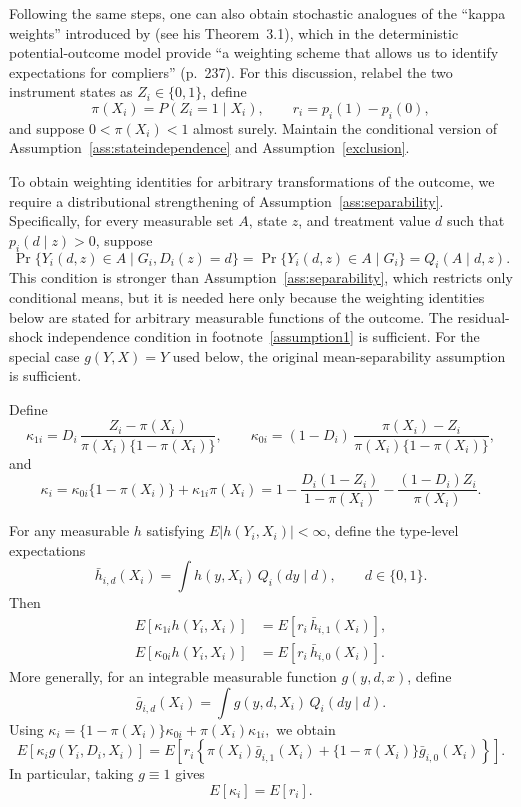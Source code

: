 \documentclass[11pt]{article}
\newcommand{\1}{\mathbf{1}}
\begin{document}
Following the same steps, one can also obtain stochastic analogues of the
``kappa weights'' introduced by \cite{abadie2003} (see his Theorem~3.1),
which in the deterministic potential-outcome model provide ``a weighting
scheme that allows us to identify expectations for compliers'' (p.~237).
For this discussion, relabel the two instrument states as
\(Z_i\in\{0,1\}\), define
\[
        \pi(X_i)=P(Z_i=1\mid X_i),
        \qquad
        r_i=p_i(1)-p_i(0),
\]
and suppose \(0<\pi(X_i)<1\) almost surely. Maintain the conditional version
of Assumption~\ref{ass:stateindependence} and
Assumption~\ref{exclusion}.

To obtain weighting identities for arbitrary transformations of the outcome,
we require a distributional strengthening of
Assumption~\ref{ass:separability}. Specifically, for every measurable set
\(A\), state \(z\), and treatment value \(d\) such that
\(p_i(d\mid z)>0\), suppose
\[
\Pr\{Y_i(d,z)\in A\mid G_i,D_i(z)=d\}
=
\Pr\{Y_i(d,z)\in A\mid G_i\}
=
Q_i(A\mid d,z).
\]
This condition is stronger than Assumption~\ref{ass:separability}, which
restricts only conditional means, but it is needed here only because the
weighting identities below are stated for arbitrary measurable functions of
the outcome. The residual-shock independence condition in
footnote~\ref{assumption1} is sufficient. For the special case
\(g(Y,X)=Y\) used below, the original mean-separability assumption is
sufficient.

Define
\[
\kappa_{1i}
=
D_i\,\frac{Z_i-\pi(X_i)}
{\pi(X_i)\{1-\pi(X_i)\}},
\qquad
\kappa_{0i}
=
(1-D_i)\,
\frac{\pi(X_i)-Z_i}
{\pi(X_i)\{1-\pi(X_i)\}},
\]
and
\[
\kappa_i
=
\kappa_{0i}\{1-\pi(X_i)\}
+
\kappa_{1i}\pi(X_i)
=
1-\frac{D_i(1-Z_i)}{1-\pi(X_i)}
-\frac{(1-D_i)Z_i}{\pi(X_i)}.
\]

For any measurable \(h\) satisfying
\(E|h(Y_i,X_i)|<\infty\), define the type-level expectations
\[
\bar h_{i,d}(X_i)
=
\int h(y,X_i)\,Q_i(dy\mid d),
\qquad d\in\{0,1\}.
\]
Then
\begin{align*}
E[\kappa_{1i}h(Y_i,X_i)]
&=
E\!\left[r_i\,\bar h_{i,1}(X_i)\right],\\
E[\kappa_{0i}h(Y_i,X_i)]
&=
E\!\left[r_i\,\bar h_{i,0}(X_i)\right].
\end{align*}
More generally, for an integrable measurable function \(g(y,d,x)\), define
\[
\bar g_{i,d}(X_i)
=
\int g(y,d,X_i)\,Q_i(dy\mid d).
\]
Using
\(
\kappa_i
=
\{1-\pi(X_i)\}\kappa_{0i}
+
\pi(X_i)\kappa_{1i},
\)
we obtain
\[
E[\kappa_i g(Y_i,D_i,X_i)]
=
E\!\left[
r_i
\left\{
\pi(X_i)\bar g_{i,1}(X_i)
+
\{1-\pi(X_i)\}\bar g_{i,0}(X_i)
\right\}
\right].
\]
In particular, taking \(g\equiv1\) gives
\[
E[\kappa_i]=E[r_i].
\]
\end{document}

